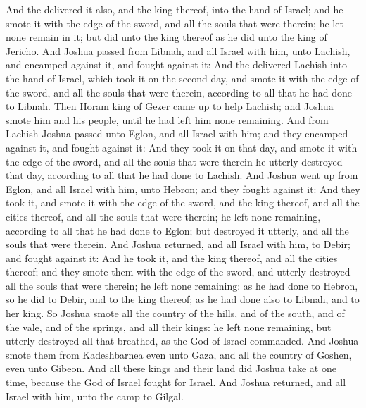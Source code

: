 \begin{biblechapter}
\verse And the \LORD delivered it also, and the king thereof, into the hand of Israel; and he smote it with the edge of the sword, and all the souls that were therein; he let none remain in it; but did unto the king thereof as he did unto the king of Jericho.
\verse And Joshua passed from Libnah, and all Israel with him, unto Lachish, and encamped against it, and fought against it:
\verse And the \LORD delivered Lachish into the hand of Israel, which took it on the second day, and smote it with the edge of the sword, and all the souls that were therein, according to all that he had done to Libnah.
\verse Then Horam king of Gezer came up to help Lachish; and Joshua smote him and his people, until he had left him none remaining.
\verse And from Lachish Joshua passed unto Eglon, and all Israel with him; and they encamped against it, and fought against it:
\verse And they took it on that day, and smote it with the edge of the sword, and all the souls that were therein he utterly destroyed that day, according to all that he had done to Lachish.
\verse And Joshua went up from Eglon, and all Israel with him, unto Hebron; and they fought against it:
\verse And they took it, and smote it with the edge of the sword, and the king thereof, and all the cities thereof, and all the souls that were therein; he left none remaining, according to all that he had done to Eglon; but destroyed it utterly, and all the souls that were therein.
\verse And Joshua returned, and all Israel with him, to Debir; and fought against it:
\verse And he took it, and the king thereof, and all the cities thereof; and they smote them with the edge of the sword, and utterly destroyed all the souls that were therein; he left none remaining: as he had done to Hebron, so he did to Debir, and to the king thereof; as he had done also to Libnah, and to her king.
\verse So Joshua smote all the country of the hills, and of the south, and of the vale, and of the springs, and all their kings: he left none remaining, but utterly destroyed all that breathed, as the \LORD God of Israel commanded.
\verse And Joshua smote them from Kadeshbarnea even unto Gaza, and all the country of Goshen, even unto Gibeon.
\verse And all these kings and their land did Joshua take at one time, because the \LORD God of Israel fought for Israel.
\verse And Joshua returned, and all Israel with him, unto the camp to Gilgal.
\end{biblechapter}

